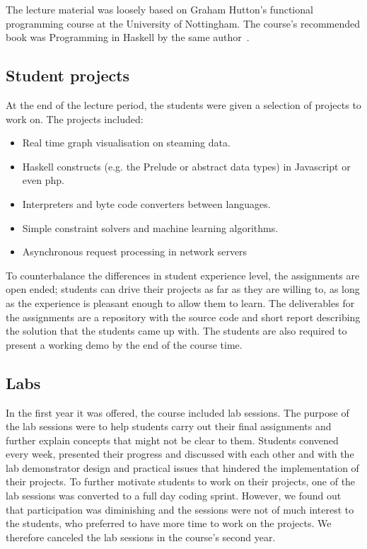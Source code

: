 \documentclass[conference]{sig-alternate}
\begin{document}
The lecture material was loosely based on Graham Hutton's functional programming
course at the University of Nottingham. The course's recommended book was
Programming in Haskell by the same author~\cite{Hutto07}.

\subsection{Student projects}

At the end of the lecture period, the students were given a selection of
projects to work on. The projects included:

\begin{itemize}

  \item Real time graph visualisation on steaming data.

  \item Haskell constructs (e.g. the Prelude or abstract data types) in Javascript or even {\sc php}. 

  \item Interpreters and byte code converters between languages.

  \item Simple constraint solvers and machine learning algorithms.

  \item Asynchronous request processing in network servers

\end{itemize}

To counterbalance the differences in student experience level, the assignments
are open ended; students can drive their projects as far as they are willing to,
as long as the experience is pleasant enough to allow them to learn. The deliverables for the
assignments are a repository with the source code and short report describing
the solution that the students came up with. The students are also required to
present a working demo by the end of the course time. 

\subsection{Labs}

In the first year it was offered, the course included lab sessions.  The purpose
of the lab sessions were to help students carry out their final assignments and
further explain concepts that might not be clear to them.  Students convened
every week, presented their progress and discussed with each other and with the
lab demonstrator design and practical issues that hindered the implementation of
their projects. To further motivate students to work on their projects, one of
the lab sessions was converted to a full day coding sprint. However, we found
out that participation was diminishing and the sessions were not of much interest to the students,
who preferred to have more time to work on the projects. We therefore canceled
the lab sessions in the course's second year. 
\end{document}
